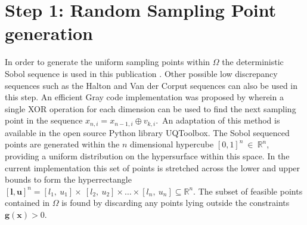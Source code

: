 \section{Step 1: Random Sampling Point generation} \label{sec:tgo1}
In order to generate the uniform sampling points within $\Omega$ the deterministic Sobol sequence is  used in this publication \cite{Henderson2015, Sobol1967}. Other possible low discrepancy sequences such as the Halton and Van der Corput sequences \cite{zbMATH03440485} can also be used in this step. An efficient Gray code implementation was proposed by \citet{Antonov1979} wherein a single XOR operation for each dimension can be used to find the next sampling point in the sequence $x_{n,i}=x_{n-1,i} \oplus v_{k,i}. \,$ An adaptation of this method is available in the open source Python library UQToolbox\cite{Bigoni2016}. The Sobol sequenced points are generated within the $n$ dimensional hypercube $ [0, 1]^n~\in ~\mathbb{R}^n $, providing a uniform distribution on the hypersurface within this space. In the current implementation this set of points is stretched across the lower and upper bounds to form the hyperrectangle $[\mathbf{l}, \mathbf{u}]^n = [l_1,~u_1] \times~[l_2,~u_2]  \times \dots \times [l_n,~u_n] \subseteq  \mathbb{R}^n$. The subset of feasible points contained in $\Omega$ is found by discarding any points lying outside the constraints $ \mathbf{g}(\mathbf{x}) > 0$.

